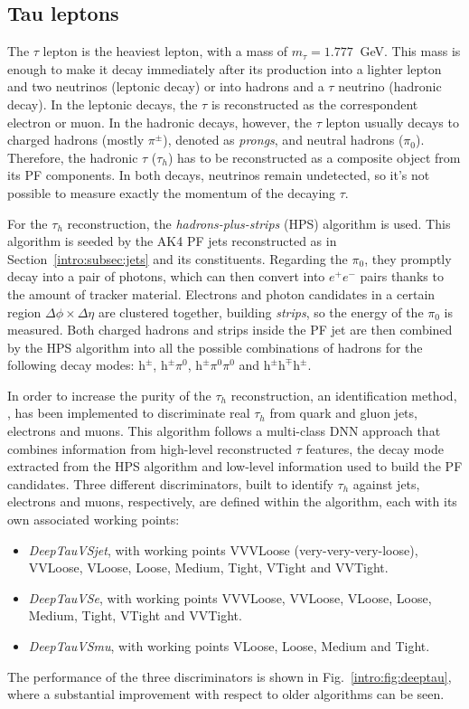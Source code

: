 \documentclass[../main.tex]{subfiles}
\begin{document}
\subsection{Tau leptons}
\label{intro:subsec:taus}

The $\tau$ lepton is the heaviest lepton, with a mass of $m_\tau = 1.777~$ GeV. This mass is enough to make it decay immediately after its production into a lighter lepton and two neutrinos (leptonic decay) or into hadrons and a $\tau$ neutrino (hadronic decay). In the leptonic decays, the $\tau$ is reconstructed as the correspondent electron or muon. In the hadronic decays, however, the $\tau$ lepton usually decays to charged hadrons (mostly $\pi^\pm$), denoted as \textit{prongs}, and neutral hadrons ($\pi_0$). Therefore, the hadronic $\tau$ ($\tau_h$) has to be reconstructed as a composite object from its PF components. In both decays, neutrinos remain undetected, so it's not possible to measure exactly the momentum of the decaying $\tau$.

For the $\tau_h$ reconstruction, the \textit{hadrons-plus-strips} (HPS) algorithm \cite{intro:id:hps} is used. This algorithm is seeded by the AK4 PF jets reconstructed as in Section~\ref{intro:subsec:jets} and its constituents. Regarding the $\pi_0$, they promptly decay into a pair of photons, which can then convert into $e^+e^-$ pairs thanks to the amount of tracker material. Electrons and photon candidates in a certain region $\Delta\phi\times\Delta\eta$ are clustered together, building \textit{strips}, so the energy of the $\pi_0$ is measured. Both charged hadrons and strips inside the PF jet are then combined by the HPS algorithm into all the possible combinations of hadrons for the following decay modes: $\text{h}^\pm$, $\text{h}^\pm\pi^0$, $\text{h}^\pm\pi^0\pi^0$ and $\text{h}^\pm \text{h}^\mp \text{h}^\pm$.

In order to increase the purity of the $\tau_h$ reconstruction, an identification method, \deeptau{} \cite{intro:id:deeptau}, has been implemented to discriminate real $\tau_h$ from quark and gluon jets, electrons and muons. This algorithm follows a multi-class DNN approach that combines information from high-level reconstructed $\tau$ features, the decay mode extracted from the HPS algorithm and low-level information used to build the PF candidates. Three different discriminators, built to identify $\tau_h$ against jets, electrons and muons, respectively, are defined within the \deeptau{} algorithm, each with its own associated working points:
\begin{itemize}
	\item \textit{DeepTauVSjet}, with working points VVVLoose (very-very-very-loose), VVLoose, VLoose, Loose, Medium, Tight, VTight and VVTight.
	\item \textit{DeepTauVSe}, with working points VVVLoose, VVLoose, VLoose, Loose, Medium, Tight, VTight and VVTight.
	\item \textit{DeepTauVSmu}, with working points VLoose, Loose, Medium and Tight.
\end{itemize}
The performance of the three discriminators is shown in Fig.~\ref{intro:fig:deeptau}, where a substantial improvement with respect to older algorithms can be seen.
\end{document}
